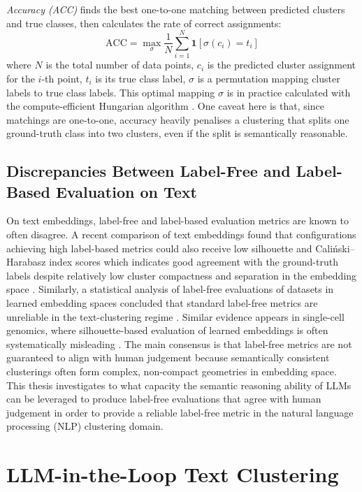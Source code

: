 \documentclass[11pt,a4paper,oneside]{report}
\begin{document}
\emph{Accuracy (ACC)} finds the best one-to-one matching between predicted clusters and true classes, then calculates the rate of correct assignments:
\begin{equation}
\mathrm{ACC} = \max_{\sigma} \frac{1}{N}\sum_{i=1}^{N} \mathbf{1}\!\left[ \sigma(c_i) = t_i \right]
\end{equation}
where $N$ is the total number of data points, $c_i$ is the predicted cluster assignment for the $i$-th point, $t_i$ is its true class label, $\sigma$ is a permutation mapping cluster labels to true class labels. This optimal mapping $\sigma$ is in practice calculated with the compute-efficient Hungarian algorithm \citep{kuhn1955hungarian}. One caveat here is that, since matchings are one-to-one, accuracy heavily penalises a clustering that splits one ground-truth class into two clusters, even if the split is semantically reasonable.

\subsection{Discrepancies Between Label-Free and Label-Based Evaluation on Text}\label{sec:discrepancies}

On text embeddings, label-free and label-based evaluation metrics are known to often disagree. A recent comparison of text embeddings found that configurations achieving high label-based metrics could also receive low silhouette and Cali\'nski--Harabasz index scores which indicates good agreement with the ground-truth labels despite relatively low cluster compactness and separation in the embedding space \citep{petukhova2025text}. Similarly, a statistical analysis of label-free evaluations of datasets in learned embedding spaces concluded that standard label-free metrics are unreliable in the text-clustering regime \citep{wang2025deep}. Similar evidence appears in single-cell genomics, where silhouette-based evaluation of learned embeddings is often systematically misleading \citep{rautenstrauch2025shortcomings}. The main consensus is that label-free metrics are not guaranteed to align with human judgement because semantically consistent clusterings often form complex, non-compact geometries in embedding space. This thesis investigates to what capacity the semantic reasoning ability of LLMs can be leveraged to produce label-free evaluations that agree with human judgement in order to provide a reliable label-free metric in the natural language processing (NLP) clustering domain.

\section{LLM-in-the-Loop Text Clustering}\label{sec:llmloop}
\end{document}
